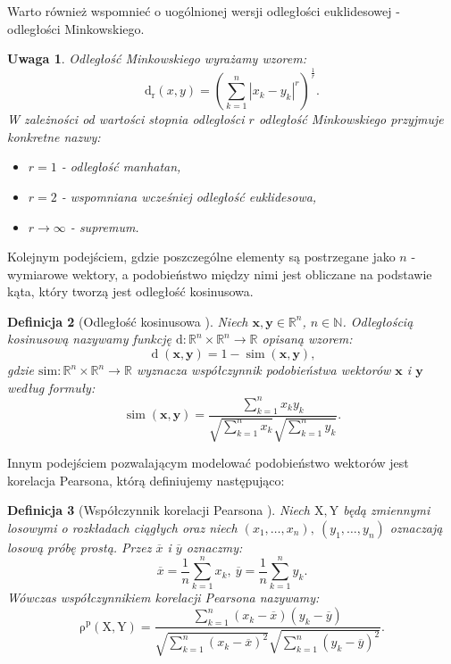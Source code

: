 \documentclass[12pt,a4paper]{report}
\newtheorem{df}{Definicja}[chapter]
\newtheorem{uwaga}[df]{Uwaga}
\newcommand{\setR}{\mathbb{R}}
\newcommand{\setN}{\mathbb{N}}
\newcommand{\rop}[2]{\operatorname{\rho^p}\left( {#1},{#2} \right)}
\newcommand{\similarity}[2]{\operatorname{sim}\left({#1}, {#2} \right)}
\newcommand{\distance}[2]{\operatorname{d}\left({#1}, {#2} \right)}
\newcommand{\distancee}[2]{\operatorname{d_r}\left({#1}, {#2} \right)}
\begin{document}
Warto również wspomnieć o uogólnionej wersji odległości euklidesowej - odległości Minkowskiego.
\begin{uwaga}
Odległość Minkowskiego wyrażamy wzorem:
$$
\distancee{x}{y} = (\sum_{k=1}^n|x_k-y_k|^r)^{\frac{1}{r}}.
$$
W zależności od wartości stopnia odległości $r$ odległość Minkowskiego przyjmuje konkretne nazwy:
\begin{itemize}
\item $r=1$ - odległość manhatan,
\item $r=2$ - wspomniana wcześniej odległość euklidesowa,
\item $r \to \infty $ - supremum. 
\end{itemize}
\end{uwaga}
Kolejnym podejściem, gdzie poszczególne elementy są postrzegane jako $n$ - wymiarowe wektory, a podobieństwo między nimi jest obliczane na podstawie kąta, który tworzą jest odległość kosinusowa.

\begin{df}[Odległość kosinusowa \citep{rsh}] %
Niech $\mathbf{x},\mathbf{y} \in \setR^n $, $n \in\setN$. Odległością kosinusową nazywamy funkcję $ \mathrm{d}: \setR^n \times \setR^n \to \setR$ opisaną wzorem:
$$
\distance{\mathbf{x}}{\mathbf{y}} = 1 - \similarity{\mathbf{x}}{\mathbf{y}},
$$ 
gdzie $\mathrm{sim}: \setR^n \times \setR^n \to \setR$ wyznacza współczynnik podobieństwa wektorów $\mathbf{x}$ i $\mathbf{y}$ według formuły:
$$
\similarity{\mathbf{x}}{\mathbf{y}} = \frac{\sum_{k=1}^n x_k y_k}{\sqrt{\sum_{k=1}^n x_k}\sqrt{\sum_{k=1}^n y_k}}.
$$
\end{df}
Innym podejściem pozwalającym modelować podobieństwo wektorów jest korelacja Pearsona, którą definiujemy następująco:

\begin{df}[Współczynnik korelacji Pearsona \citep{rsh}]

Niech $\mathrm{X},\mathrm{Y}$ będą zmiennymi losowymi o rozkładach ciągłych oraz niech $(x_1, \ldots, x_n), \: (y_1, \ldots, y_n)$ oznaczają losową próbę prostą. 
Przez $\overline{x}$ i $\overline{y}$ oznaczmy:
$$
\overline{x}=\frac{1}{n} \sum_{k=1}^n x_k, \: \overline{y}=\frac{1}{n} \sum_{k=1}^n y_k.
$$
Wówczas współczynnikiem korelacji Pearsona nazywamy:
$$
\rop{\mathrm{X}}{\mathrm{Y}} = \frac{\sum_{k=1}^n(x_k - \overline{x})(y_k - \overline{y})}{\sqrt{\sum_{k=1}^n(x_k - \overline{x})^2} \sqrt{\sum_{k=1}^n(y_k - \overline{y})^2 }}.
$$
\end{df}
\end{document}
